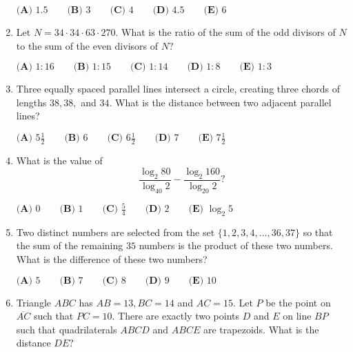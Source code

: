 \documentclass{article}
\begin{document}
\begin{enumerate}[label=\arabic*., itemsep=0.5em]
\(\textbf{(A) }1.5 \qquad \textbf{(B) }3 \qquad \textbf{(C) }4 \qquad \textbf{(D) }4.5 \qquad \textbf{(E) }6\)\par \vspace{0.5em}\item Let \(N=34\cdot34\cdot63\cdot270.\) What is the ratio of the sum of the odd divisors of \(N\) to the sum of the even divisors of \(N?\)

\(\textbf{(A) }1:16 \qquad \textbf{(B) }1:15 \qquad \textbf{(C) }1:14 \qquad \textbf{(D) }1:8 \qquad \textbf{(E) }1:3\)\par \vspace{0.5em}\item Three equally spaced parallel lines intersect a circle, creating three chords of lengths \(38,38,\) and \(34\). What is the distance between two adjacent parallel lines?

\(\textbf{(A) }5\frac12 \qquad \textbf{(B) }6 \qquad \textbf{(C) }6\frac12 \qquad \textbf{(D) }7 \qquad \textbf{(E) }7\frac12\)\par \vspace{0.5em}\item What is the value of
\begin{equation*}
\frac{\log_2 80}{\log_{40}2}-\frac{\log_2 160}{\log_{20}2}?
\end{equation*}

\(\textbf{(A) }0 \qquad \textbf{(B) }1 \qquad \textbf{(C) }\frac54 \qquad \textbf{(D) }2 \qquad \textbf{(E) }\log_2 5\)\par \vspace{0.5em}\item Two distinct numbers are selected from the set \(\{1,2,3,4,\dots,36,37\}\) so that the sum of the remaining \(35\) numbers is the product of these two numbers. What is the difference of these two numbers?

\(\textbf{(A) }5 \qquad \textbf{(B) }7 \qquad \textbf{(C) }8\qquad \textbf{(D) }9 \qquad \textbf{(E) }10\)\par \vspace{0.5em}\item Triangle \(ABC\) has \(AB=13,BC=14\) and \(AC=15\). Let \(P\) be the point on \(\overline{AC}\) such that \(PC=10\). There are exactly two points \(D\) and \(E\) on line \(BP\) such that quadrilaterals \(ABCD\) and \(ABCE\) are trapezoids. What is the distance \(DE?\)


\end{enumerate}
\end{document}
